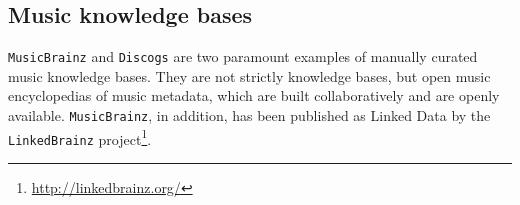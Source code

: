 

\subsection{Music knowledge bases}\label{sec:SOA:nlu:mkbs}

\texttt{MusicBrainz} and \texttt{Discogs} are two paramount examples of manually curated music knowledge bases. They are not strictly knowledge bases, but open music encyclopedias of music metadata, which are built collaboratively and are openly available. \texttt{MusicBrainz}, in addition, has been published as Linked Data by the \texttt{LinkedBrainz} project\footnote{\url{http://linkedbrainz.org/}}.

